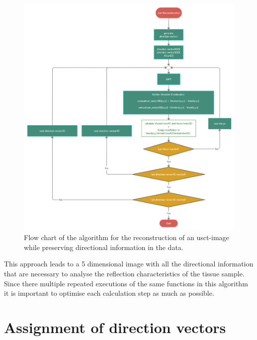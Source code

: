 \begin{figure}[H]
    \centering
    \includegraphics[width=1.13\textwidth]{Graphics/AngleIndex_Algorithm.png}
    \caption{Flow chart of the algorithm for the reconstruction of an \ac{usct}-image while preserving directional information in the data.}
    \label{Basic_Algo_Angle_ident}
\end{figure}

This approach leads to a 5 dimensional image with all the directional information that are necessary to analyse the reflection characteristics of the tissue sample. Since there multiple repeated executions of the same functions in this algorithm it is important to optimise each calculation step as much as possible. 








\section{Assignment of direction vectors}
\label{sec:index_ident}

